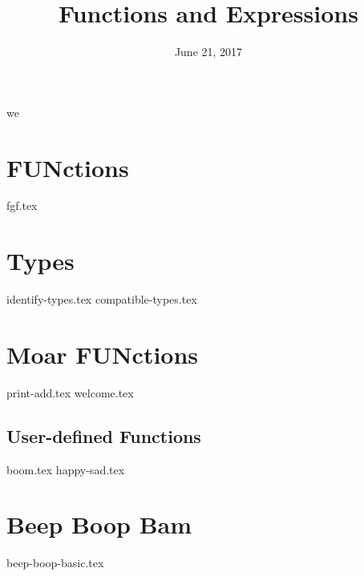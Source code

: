 we\documentclass{exam}
\title{Functions and Expressions}
\date{June 21, 2017}
\begin{document}
\maketitle

\section{FUNctions}
\begin{questions}
{fgf.tex}
\end{questions}

\section{Types}
\begin{questions}
{identify-types.tex}
{compatible-types.tex}
\end{questions}

\section{Moar FUNctions}
\begin{questions}
{print-add.tex}
{welcome.tex}
\subsection*{User-defined Functions}
{boom.tex}
{happy-sad.tex}
\end{questions}

\section{Beep Boop Bam}
\begin{questions}
{beep-boop-basic.tex}
\end{questions}
\end{document}

